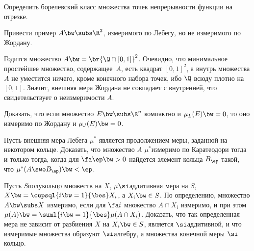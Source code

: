 \documentclass[a4paper,draft]{article}
\begin{document}
\begin{problem}
  Определить борелевский класс множества точек непрерывности функции на отрезке.
\end{problem}

\begin{problem}
  Привести пример $A \bw\subs \R^2$, измеримого по Лебегу, но не измеримого по Жордану.
\end{problem}
\begin{solution}
  Годится множество $A\bw=\br{\Q \cap [0,1]}^2$. Очевидно, что минимальное простейшее множество,
  содержащее~$A$, есть квадрат $[0,1]^2$, а внутрь множества $A$ не уместится ничего, кроме
  конечного набора точек, ибо $\Q$ всюду плотно на $[0,1]$. Значит, внешняя мера Жордана не
  совпадает с внутренней, что свидетельствует о неизмеримости $A$.
\end{solution}

\begin{problem}
  Доказать, что если множество $E \bw\subs \R^n$ компактно и $\mu_L(E)\bw=0$, то оно измеримо по
  Жордану и $\mu_J(E)\bw=0$.
\end{problem}

\begin{problem}
  Пусть внешняя мера Лебега $\mu^*$ является продолжением меры, заданной на некотором кольце.
  Доказать, что множество $A$ $\mu^*$\д измеримо по Каратеодори тогда и только тогда, когда
  для $\fa \ep \bw> 0$ найдется элемент кольца $B_\ep$ такой, что $\mu^*(A \swo B_\ep) \bw< \ep$.
\end{problem}

\begin{problem}
  Пусть $S$\т полукольцо множеств на $X$, $\mu$\т $\si$\д аддитивная мера на $S$,
  $X\bw=\cupsql{i\bw=1}{\bes} X_i$, а $X_i \bw\in S$. По определению, множество $A \bw\subs X$ измеримо, если
  для $\fa i$ множество $A \cap X_i$ измеримо, и при этом $\mu(A) \bw= \suml{i\bw=1}{\bes}\mu(A\cap
  X_i)$. Доказать, что так определенная мера не зависит от разбиения $X$ на $X_i \bw\in S$, является
  $\si$\д аддитивной, и что измеримые множества образуют $\si$\д алгебру, а множества конечной меры\т
  $\si$\д кольцо.
\end{problem}
\end{document}
